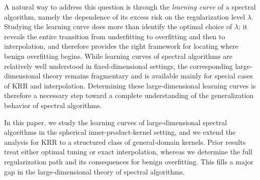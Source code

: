 \documentclass{article}
\theoremstyle{plain}
\theoremstyle{definition}
\theoremstyle{remark}
\begin{document}
A natural way to address this question is through the \emph{learning curve} of a spectral algorithm, namely the dependence of its excess risk on the regularization level $\lambda$. 
Studying the learning curve does more than identify the optimal choice of $\lambda$; it reveals the entire transition from underfitting to overfitting and then to interpolation, and therefore provides the right framework for locating where benign overfitting begins. 
While learning curves of spectral algorithms are relatively well understood in fixed-dimensional settings, the corresponding large-dimensional theory remains fragmentary and is available mainly for special cases of KRR and interpolation.
Determining these large-dimensional learning curves is therefore a necessary step toward a complete understanding of the generalization behavior of spectral algorithms.



In this paper, we study the learning curves of large-dimensional spectral algorithms in the spherical inner-product-kernel setting, and we extend the analysis for KRR to a structured class of general-domain kernels.
Prior results treat either optimal tuning or exact interpolation, whereas we determine the full regularization path and its consequences for benign overfitting. 
This fills a major gap in the large-dimensional theory of spectral algorithms. 
\end{document}
